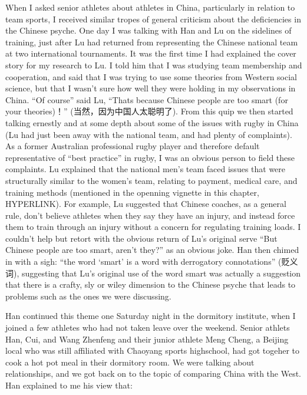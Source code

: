 When I asked senior athletes about athletes in China, particularly in relation to team sports, I received similar tropes of general  criticism about the deficiencies in the Chinese psyche.  One day I was talking with Han and Lu on the sidelines of training, just after Lu had returned from representing the Chinese national team at two international tournaments. It was the first time I had explained the cover story for my research to Lu.  I told him that I was studying team membership and cooperation, and said that I was trying to use some theories from Western social science, but that I wasn't sure how well they were holding in my observations in China. ``Of course'' said Lu, ``Thats because Chinese people are too smart (for your theories)！''  (当然，因为中国人太聪明了).  From this quip we then started talking ernestly and at some depth about some of the issues with rugby in China (Lu had just been away with the national team, and had plenty of complaints).  As a former Australian professional rugby player and therefore default representative of ``best practice'' in rugby, I was an obvious person to field these complaints. Lu explained that the national men's team faced issues that were structurally similar to the women's team, relating to payment, medical care, and training methods (mentioned in the openning vignette in this chapter, HYPERLINK).  For example, Lu suggested that Chinese coaches, as a general rule, don't believe athletes when they say they have an injury, and instead force them to train through an injury without a concern for regulating training loads. I couldn't help but retort with the obvious return of Lu's original serve ``But Chinese people are too smart, aren't they?'' as an obvious joke.  Han then chimed in with a sigh: ``the word `smart' is a word with derrogatory connotations'' (贬义词), suggesting that Lu's original use of the word smart was actually a suggestion that there is a crafty, sly or wiley dimension to the Chinese psyche that leads to problems such as the ones we were discussing.

Han continued this theme one Saturday night in the dormitory institute, when I joined a few athletes who had not taken leave over the weekend. Senior athlets Han, Cui, and Wang Zhenfeng and their junior athlete Meng Cheng, a Beijing local who was still affiliated with Chaoyang sports highschool, had got togeher to cook a hot pot meal in their dormitory room.  We were talking about relationships, and we got back on to the topic of comparing China with the West.  Han explained to me his view that:

